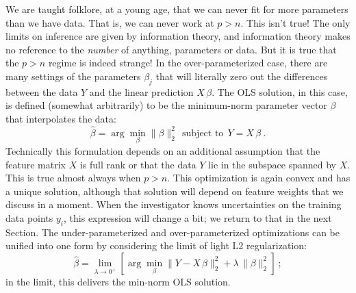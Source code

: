 \documentclass[12pt,letterpaper]{article}
\newcommand{\sectionname}{Section}
\begin{document}
We are taught folklore, at a young age, that we can never fit for more parameters than we have data. That is, we can never work at $p>n$.
This isn't true!
The only limits on inference are given by information theory, and information theory makes no reference to the \emph{number} of anything, parameters or data.
But it is true that the $p>n$ regime is indeed strange!
In the over-parameterized case, there are many settings of the parameters $\beta_j$ that will literally zero out the differences between the data $Y$ and the linear prediction $X\,\beta$.
The OLS solution, in this case, is defined (somewhat arbitrarily) to be the minimum-norm parameter vector $\beta$ that interpolates the data:
\begin{equation}
    \hat{\beta} = \arg\min_\beta \|\beta\|_2^2 ~~\mbox{subject to}~~ Y = X\,\beta
    ~.
\end{equation}
Technically this formulation depends on an additional assumption that the feature matrix $X$ is full rank or that the data $Y$ lie in the subspace spanned by $X$.
This is true almost always when $p>n$.
This optimization is again convex and has a unique solution, although that solution will depend on feature weights that we discuss in a moment.
When the investigator knows uncertainties on the training data points $y_i$, this expression will change a bit; we return to that in the next \sectionname.
The under-parameterized and over-parameterized optimizations can be unified into one form by considering the limit of light L2 regularization:
\begin{equation}
    \hat{\beta} = \lim_{\lambda\rightarrow 0^+}\left[\arg\min_\beta \|Y - X\,\beta\|_2^2 + \lambda\,\|\beta\|_2^2\right]
    ~;
\end{equation}
in the limit, this delivers the min-norm OLS solution.
\end{document}
